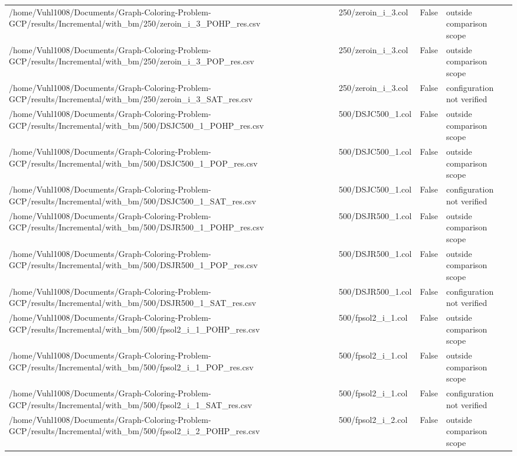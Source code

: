 \begin{table}[htbp]
\begin{tabular}{llll}
/home/Vuhl1008/Documents/Graph-Coloring-Problem-GCP/results/Incremental/with\_bm/250/zeroin\_i\_3\_POHP\_res.csv & 250/zeroin\_i\_3.col & False & outside comparison scope \\
/home/Vuhl1008/Documents/Graph-Coloring-Problem-GCP/results/Incremental/with\_bm/250/zeroin\_i\_3\_POP\_res.csv & 250/zeroin\_i\_3.col & False & outside comparison scope \\
/home/Vuhl1008/Documents/Graph-Coloring-Problem-GCP/results/Incremental/with\_bm/250/zeroin\_i\_3\_SAT\_res.csv & 250/zeroin\_i\_3.col & False & configuration not verified \\
/home/Vuhl1008/Documents/Graph-Coloring-Problem-GCP/results/Incremental/with\_bm/500/DSJC500\_1\_POHP\_res.csv & 500/DSJC500\_1.col & False & outside comparison scope \\
/home/Vuhl1008/Documents/Graph-Coloring-Problem-GCP/results/Incremental/with\_bm/500/DSJC500\_1\_POP\_res.csv & 500/DSJC500\_1.col & False & outside comparison scope \\
/home/Vuhl1008/Documents/Graph-Coloring-Problem-GCP/results/Incremental/with\_bm/500/DSJC500\_1\_SAT\_res.csv & 500/DSJC500\_1.col & False & configuration not verified \\
/home/Vuhl1008/Documents/Graph-Coloring-Problem-GCP/results/Incremental/with\_bm/500/DSJR500\_1\_POHP\_res.csv & 500/DSJR500\_1.col & False & outside comparison scope \\
/home/Vuhl1008/Documents/Graph-Coloring-Problem-GCP/results/Incremental/with\_bm/500/DSJR500\_1\_POP\_res.csv & 500/DSJR500\_1.col & False & outside comparison scope \\
/home/Vuhl1008/Documents/Graph-Coloring-Problem-GCP/results/Incremental/with\_bm/500/DSJR500\_1\_SAT\_res.csv & 500/DSJR500\_1.col & False & configuration not verified \\
/home/Vuhl1008/Documents/Graph-Coloring-Problem-GCP/results/Incremental/with\_bm/500/fpsol2\_i\_1\_POHP\_res.csv & 500/fpsol2\_i\_1.col & False & outside comparison scope \\
/home/Vuhl1008/Documents/Graph-Coloring-Problem-GCP/results/Incremental/with\_bm/500/fpsol2\_i\_1\_POP\_res.csv & 500/fpsol2\_i\_1.col & False & outside comparison scope \\
/home/Vuhl1008/Documents/Graph-Coloring-Problem-GCP/results/Incremental/with\_bm/500/fpsol2\_i\_1\_SAT\_res.csv & 500/fpsol2\_i\_1.col & False & configuration not verified \\
/home/Vuhl1008/Documents/Graph-Coloring-Problem-GCP/results/Incremental/with\_bm/500/fpsol2\_i\_2\_POHP\_res.csv & 500/fpsol2\_i\_2.col & False & outside comparison scope \\

\end{tabular}
\end{table}
